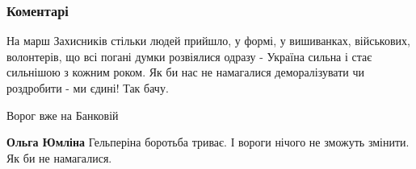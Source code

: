  
 
 
 
 
\subsubsection{Коментарі}

\begin{itemize}

 

На марш Захисників стільки людей прийшло, у формі, у вишиванках, військових,
волонтерів, що всі погані думки розвіялися одразу - Україна сильна і стає
сильнішою з кожним роком. Як би нас не намагалися деморалізувати чи роздробити
- ми єдині! Так бачу.




 

Ворог вже на Банковій

\begin{itemize}
 
\textbf{Ольга Юмліна} Гельперіна боротьба триває. І вороги нічого не зможуть змінити. Як би не намагалися.
\end{itemize}

 

\end{itemize}
